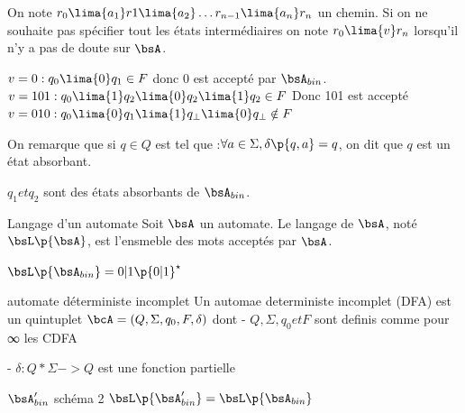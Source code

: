     \begin{notation}
        \begin{enumerate}
            \itt On note $r_0\lima{a_1} r1 \lima{a_2} \dots r_{n - 1} \lima{a_n} r_n$ un chemin.
            \itt Si on ne souhaite pas spécifier tout les états intermédiaires on note $r_0 \lima{v} r_n$ lorsqu'il n'y a pas de doute sur $\bsA$.
        \end{enumerate}
    \end{notation}
    
    \begin{example}{}{}
        \begin{enumerate}
            \itt $v = 0 : q_0 \lima{0} q_1 \in F$ donc 0 est accepté par $\bsA_{bin}$.
            \itt $v = 101 : q_0 \lima{1} q_2 \lima{0} q_2 \lima{1} q_2 \in F$ Donc 101 est accepté
            \itt $v = 010 : q_0 \lima{0} q_1 \lima{1} q_\bot \lima{0} q_\bot \notin F$
        \end{enumerate}
    \end{example}
    
    On remarque que si $q \in Q$ est tel que :$\forall a \in \Sigma, \delta \p{q, a} = q$, on dit que $q$ est un état absorbant.
    
    \begin{example}{}{}
        $q_1 et q_2$ sont des états absorbants de $\bsA_{bin}$.
    \end{example}
    
    \begin{definition}{Langage d'un automate}{}
        Soit $\bsA$ un automate. Le langage de $\bsA$, noté $\bsL \p{\bsA}$, est l'ensmeble des mots acceptés par $\bsA$.
    \end{definition}
    
    \begin{example}{}{}
        $\bsL \p{\bsA_{bin}} = 0 \vert 1 \p{0 \vert 1}^\star$
    \end{example}
    
    \begin{definition}{automate déterministe incomplet}{}
        Un automae deterministe incomplet (DFA)
        est un quintuplet $\bcA = (Q,\Sigma, q_0, F, \delta)$ dont - $Q,
        \Sigma, q_0 et F$ sont definis comme pour ∞ les CDFA 
             
             - $\delta :  Q * \Sigma -> Q $ est une fonction partielle 
    \end{definition}
    
    \begin{example}{}{}
        $\bsA_{bin}'$ \newline
        schéma 2 \newline
        $\bsL \p{\bsA_{bin}'} = \bsL \p{\bsA_{bin}}$
    \end{example}
    
